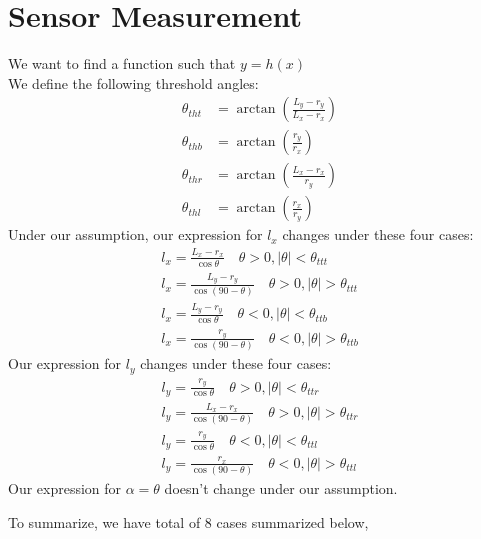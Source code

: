 \documentclass[12pt, letterpaper]{amsart} %
\numberwithin{equation}{section}
\begin{document}
\section{Sensor Measurement}
We want to find a function such that $y = h(x)$ \\
We define the following threshold angles:
\begin{align*}
  \theta_{tht} &= \arctan(\frac{L_y - r_y}{L_x - r_x}) \\
  \theta_{thb} &= \arctan(\frac{r_y}{r_x}) \\
  \theta_{thr} &= \arctan(\frac{L_x-r_x}{r_y}) \\
  \theta_{thl} &= \arctan(\frac{r_x}{r_y})
\end{align*}
Under our assumption, our expression for $l_x$  changes under these four cases:
\begin{align*}
  l_x = \frac{L_x - r_x}{\cos \theta} \quad \theta > 0, |\theta| < \theta_{ttt} \\
  l_x = \frac{L_y - r_y}{\cos (90 - \theta)} \quad \theta > 0, |\theta| > \theta_{ttt} \\
  l_x = \frac{L_y - r_y}{\cos \theta} \quad \theta < 0, |\theta| < \theta_{ttb} \\
  l_x = \frac{r_y}{\cos (90 - \theta)} \quad \theta < 0, |\theta| > \theta_{ttb}
\end{align*}
Our expression for $l_y$ changes under these four cases:
\begin{align*}
  l_y = \frac{r_y}{\cos \theta} \quad \theta > 0, |\theta| < \theta_{ttr} \\
  l_y = \frac{L_x - r_x}{\cos (90 - \theta)} \quad \theta > 0, |\theta| > \theta_{ttr} \\
  l_y = \frac{r_y}{\cos \theta} \quad \theta < 0, |\theta| < \theta_{ttl} \\
  l_y = \frac{r_x}{\cos (90 -\theta)} \quad \theta < 0, |\theta| > \theta_{ttl}
\end{align*}
Our expression for $\alpha = \theta$ doesn't change under our assumption. \par
To summarize, we have total of 8 cases summarized below,
\end{document}
